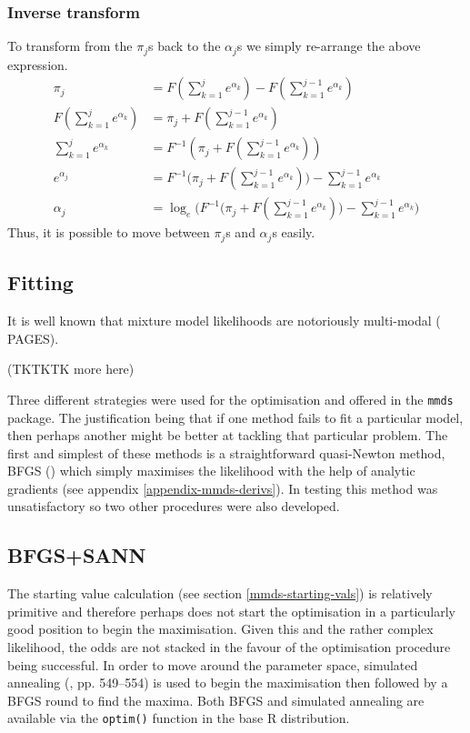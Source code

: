 \subsubsection{Inverse transform}
\label{mmds-pi-inv}
To transform from the $\pi_j$s back to the $\alpha_j$s we simply re-arrange the above expression.
\begin{align*}
\pi_j &= F(\sum_{k=1}^j e^{\alpha_k}) - F(\sum_{k=1}^{j-1} e^{\alpha_k})\\
F(\sum_{k=1}^j e^{\alpha_k}) &= \pi_j + F(\sum_{k=1}^{j-1} e^{\alpha_k})\\
\sum_{k=1}^j e^{\alpha_k} &= F^{-1}(\pi_j + F(\sum_{k=1}^{j-1} e^{\alpha_k}))\\
e^{\alpha_j} &= F^{-1}\Big(\pi_j + F(\sum_{k=1}^{j-1} e^{\alpha_k})\Big) - \sum_{k=1}^{j-1} e^{\alpha_k}\\
\alpha_j &= \log_e \Big(F^{-1}\Big(\pi_j + F(\sum_{k=1}^{j-1} e^{\alpha_k})\Big) - \sum_{k=1}^{j-1} e^{\alpha_k}\Big)
\end{align*}
Thus, it is possible to move between $\pi_j$s and $\alpha_j$s easily.

\subsection{Fitting}
It is well known that mixture model likelihoods are notoriously multi-modal (\cite{BDA} PAGES).

(TKTKTK more here)

Three different strategies were used for the optimisation and offered in the \texttt{mmds} package. The justification being that if one method fails to fit a particular model, then perhaps another might be better at tackling that particular problem. The first and simplest of these methods is a straightforward quasi-Newton method, BFGS (\cite{bfgs}) which simply maximises the likelihood with the help of analytic gradients (see appendix \ref{appendix-mmds-derivs}). In testing this method was unsatisfactory so two other procedures were also developed.

\subsection{BFGS+SANN}
The starting value calculation (see section \ref{mmds-starting-vals}) is relatively primitive and therefore perhaps does not start the optimisation in a particularly good position to begin the maximisation. Given this and the rather complex likelihood, the odds are not stacked in the favour of the optimisation procedure being successful. In order to move around the parameter space, simulated annealing (\cite{numrec}, pp. 549--554) is used to begin the maximisation then followed by a BFGS round to find the maxima. Both BFGS and simulated annealing are available via the \texttt{optim()} function in the base \textsf{R} distribution.

